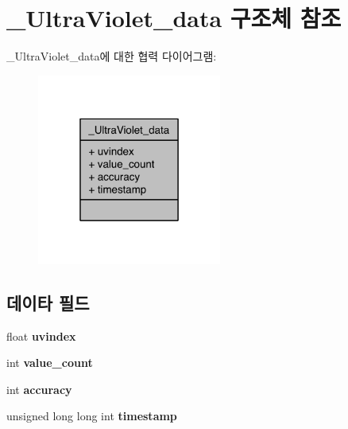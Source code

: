 \hypertarget{struct___ultra_violet__data}{\section{\-\_\-\-Ultra\-Violet\-\_\-data 구조체 참조}
\label{struct___ultra_violet__data}
}


\-\_\-\-Ultra\-Violet\-\_\-data에 대한 협력 다이어그램\-:\nopagebreak
\begin{figure}[H]
\begin{center}
\leavevmode
\includegraphics[width=172pt]{db/d01/struct___ultra_violet__data__coll__graph}
\end{center}
\end{figure}
\subsection*{데이타 필드}
\begin{DoxyCompactItemize}
\item 
\hypertarget{struct___ultra_violet__data_a46f441c4177376452cb467caa0b7fa46}{float {\bfseries uvindex}}\label{struct___ultra_violet__data_a46f441c4177376452cb467caa0b7fa46}

\item 
\hypertarget{struct___ultra_violet__data_a40a079bfc72408819dc78da308203a74}{int {\bfseries value\-\_\-count}}\label{struct___ultra_violet__data_a40a079bfc72408819dc78da308203a74}

\item 
\hypertarget{struct___ultra_violet__data_a5565cf9073275f9713f9016e7c10d25f}{int {\bfseries accuracy}}\label{struct___ultra_violet__data_a5565cf9073275f9713f9016e7c10d25f}

\item 
\hypertarget{struct___ultra_violet__data_a8de02c4128636a7bf630ff5428f60c8d}{unsigned long long int {\bfseries timestamp}}\label{struct___ultra_violet__data_a8de02c4128636a7bf630ff5428f60c8d}

\end{DoxyCompactItemize}


